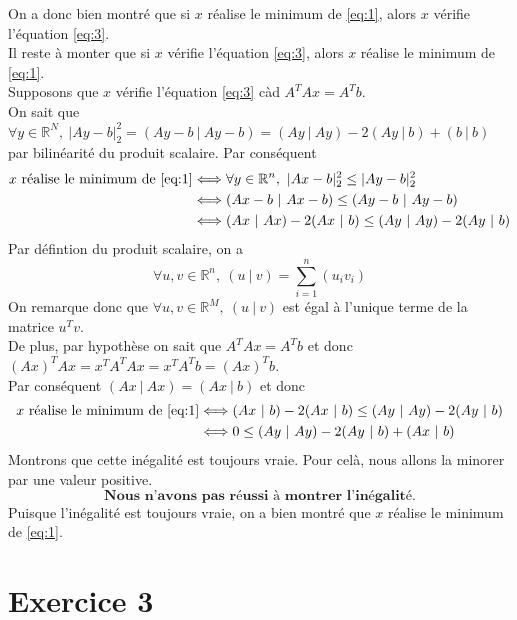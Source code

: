 \documentclass[a4paper, 10pt]{article}
\newcommand{\IR}{\mathbb{R}}
\begin{document}
On a donc bien montré que si \( x \) réalise le minimum de \eqref{eq:1}, alors \( x \) vérifie l'équation \eqref{eq:3}. \\
Il reste à monter que si \( x \) vérifie l'équation \eqref{eq:3}, alors \( x \) réalise le minimum de \eqref{eq:1}. \\
Supposons que \( x \) vérifie l'équation \eqref{eq:3} càd \( A^T A x = A^T b \). \\
On sait que \( \forall y \in \IR^N,~ |Ay - b|_2^2 = (Ay - b ~|~ Ay - b) = (Ay ~|~ Ay) - 2(Ay ~|~ b) + (b ~|~ b) \) par bilinéarité du produit scalaire. Par conséquent
\begin{align*}
    x \text{ réalise le minimum de } \eqref{eq:1}
    & \Longleftrightarrow \forall y \in \IR^n,~ |Ax - b|_2^2 \leq |Ay - b|_2^2 \\
    & \Longleftrightarrow (Ax - b ~|~ Ax - b) \leq (Ay - b ~|~ Ay - b) \\
    & \Longleftrightarrow (Ax ~|~ Ax) - 2(Ax ~|~ b) \leq (Ay ~|~ Ay) - 2(Ay ~|~ b)
\end{align*}
Par défintion du produit scalaire, on a
$$
\forall u, v \in \IR^n,~ (u ~|~ v) = \sum_{i = 1}^n (u_i v_i)
$$
On remarque donc que \( \forall u, v \in \IR^M,~ (u ~|~ v) \) est égal à l'unique terme de la matrice \( u^T v \). \\
De plus, par hypothèse on sait que \( A^TAx = A^Tb \) et donc \( (Ax)^T Ax = x^T A^T A x = x^T A^Tb = (Ax)^T b \). \\
Par conséquent \( (Ax ~|~ Ax) = (Ax ~|~ b) \) et donc
\begin{align*}
    x \text{ réalise le minimum de } \eqref{eq:1}
    & \Longleftrightarrow (Ax ~|~ b) - 2(Ax ~|~ b) \leq (Ay ~|~ Ay) - 2(Ay ~|~ b) \\
    & \Longleftrightarrow 0 \leq (Ay ~|~ Ay) - 2(Ay ~|~ b) + (Ax ~|~ b)
\end{align*}
Montrons que cette inégalité est toujours vraie. Pour celà, nous allons la minorer par une valeur positive. \\
$$
\textbf{Nous n'avons pas réussi à montrer l'inégalité.}
$$
Puisque l'inégalité est toujours vraie, on a bien montré que \( x \) réalise le minimum de \eqref{eq:1}.

\newpage

\section{Exercice 3}
\end{document}

